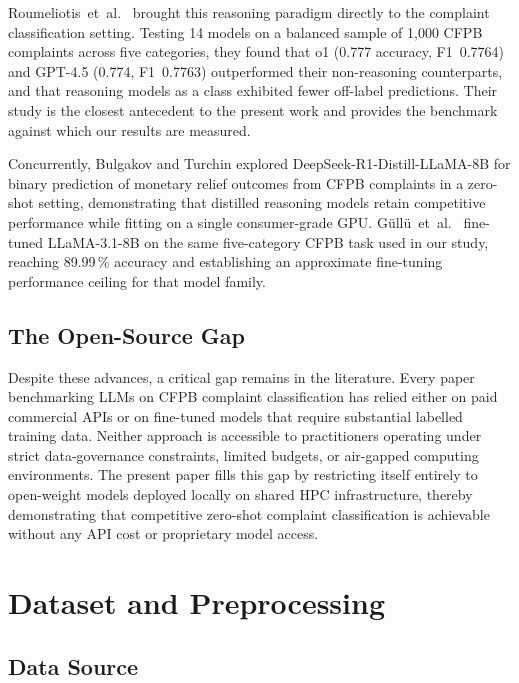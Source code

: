 \documentclass[journal]{IEEEtran}
\begin{document}
Roumeliotis~et~al.\ \cite{roumeliotis2025think} brought this reasoning
paradigm directly to the complaint classification setting. Testing
14 models on a balanced sample of 1,000 CFPB complaints across five
categories, they found that o1 (0.777 accuracy, F1~0.7764) and
GPT-4.5 (0.774, F1~0.7763) outperformed their non-reasoning
counterparts, and that reasoning models as a class exhibited fewer
off-label predictions. Their study is the closest antecedent to the
present work and provides the benchmark against which our results
are measured.

Concurrently, Bulgakov and Turchin \cite{bulgakov2026deepseek} explored
DeepSeek-R1-Distill-LLaMA-8B for binary prediction of monetary relief
outcomes from CFPB complaints in a zero-shot setting, demonstrating
that distilled reasoning models retain competitive performance while
fitting on a single consumer-grade GPU. G{\"u}ll{\"u}~et~al.\
\cite{gullu2025llama} fine-tuned LLaMA-3.1-8B on the same five-category
CFPB task used in our study, reaching 89.99\,\% accuracy and
establishing an approximate fine-tuning performance ceiling for that
model family.

\subsection{The Open-Source Gap}

Despite these advances, a critical gap remains in the literature. Every
paper benchmarking LLMs on CFPB complaint classification has relied
either on paid commercial APIs or on fine-tuned models that require
substantial labelled training data. Neither approach is accessible to
practitioners operating under strict data-governance constraints,
limited budgets, or air-gapped computing environments. The present
paper fills this gap by restricting itself entirely to open-weight
models deployed locally on shared HPC infrastructure, thereby
demonstrating that competitive zero-shot complaint classification is
achievable without any API cost or proprietary model access.


\section{Dataset and Preprocessing}
\label{sec:data}

\subsection{Data Source}
\end{document}
